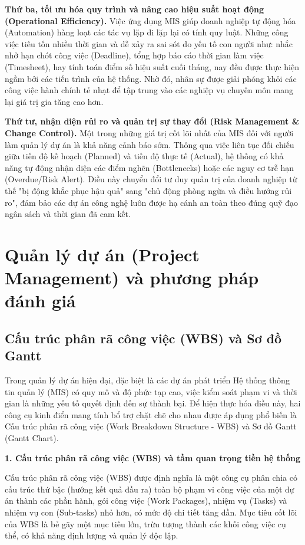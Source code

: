 \documentclass[a4paper,13.5pt]{extreport}
\begin{document}
\textbf{Thứ ba, tối ưu hóa quy trình và nâng cao hiệu suất hoạt động (Operational Efficiency).} 
Việc ứng dụng MIS giúp doanh nghiệp tự động hóa (Automation) hàng loạt các tác vụ lặp đi lặp lại có tính quy luật. Những công việc tiêu tốn nhiều thời gian và dễ xảy ra sai sót do yếu tố con người như: nhắc nhở hạn chót công việc (Deadline), tổng hợp báo cáo thời gian làm việc (Timesheet), hay tính toán điểm số hiệu suất cuối tháng, nay đều được thực hiện ngầm bởi các tiến trình của hệ thống. Nhờ đó, nhân sự được giải phóng khỏi các công việc hành chính tẻ nhạt để tập trung vào các nghiệp vụ chuyên môn mang lại giá trị gia tăng cao hơn.

\textbf{Thứ tư, nhận diện rủi ro và quản trị sự thay đổi (Risk Management \& Change Control).} 
Một trong những giá trị cốt lõi nhất của MIS đối với người làm quản lý dự án là khả năng cảnh báo sớm. Thông qua việc liên tục đối chiếu giữa tiến độ kế hoạch (Planned) và tiến độ thực tế (Actual), hệ thống có khả năng tự động nhận diện các điểm nghẽn (Bottlenecks) hoặc các nguy cơ trễ hạn (Overdue/Risk Alert). Điều này chuyển đổi tư duy quản trị của doanh nghiệp từ thế "bị động khắc phục hậu quả" sang "chủ động phòng ngừa và điều hướng rủi ro", đảm bảo các dự án công nghệ luôn được hạ cánh an toàn theo đúng quỹ đạo ngân sách và thời gian đã cam kết.

\section{Quản lý dự án (Project Management) và phương pháp đánh giá}
\subsection{Cấu trúc phân rã công việc (WBS) và Sơ đồ Gantt}

Trong quản lý dự án hiện đại, đặc biệt là các dự án phát triển Hệ thống thông tin quản lý (MIS) có quy mô và độ phức tạp cao, việc kiểm soát phạm vi và thời gian là những yếu tố quyết định đến sự thành bại. Để hiện thực hóa điều này, hai công cụ kinh điển mang tính bổ trợ chặt chẽ cho nhau được áp dụng phổ biến là Cấu trúc phân rã công việc (Work Breakdown Structure - WBS) và Sơ đồ Gantt (Gantt Chart).

\textbf{1. Cấu trúc phân rã công việc (WBS) và tầm quan trọng tiền hệ thống}

Cấu trúc phân rã công việc (WBS) được định nghĩa là một công cụ phân chia có cấu trúc thứ bậc (hướng kết quả đầu ra) toàn bộ phạm vi công việc của một dự án thành các phần hành, gói công việc (Work Packages), nhiệm vụ (Tasks) và nhiệm vụ con (Sub-tasks) nhỏ hơn, có mức độ chi tiết tăng dần. Mục tiêu cốt lõi của WBS là bẻ gãy một mục tiêu lớn, trừu tượng thành các khối công việc cụ thể, có khả năng định lượng và quản lý độc lập.
\end{document}
